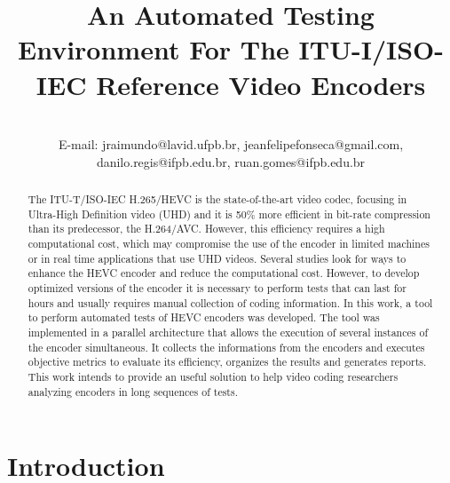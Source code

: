 \documentclass[journal]{IEEEtran}
\begin{document}
\title{An Automated Testing Environment For The ITU-I/ISO-IEC Reference Video Encoders}

\author{
							
\\E-mail:  jraimundo@lavid.ufpb.br, jeanfelipefonseca@gmail.com, danilo.regis@ifpb.edu.br, ruan.gomes@ifpb.edu.br
}


\maketitle
\begin{abstract}

The ITU-T/ISO-IEC H.265/HEVC is the state-of-the-art video codec, focusing in Ultra-High Definition video (UHD) and it is 50\% more efficient in bit-rate compression than its predecessor, the H.264/AVC. However, this efficiency requires a high computational cost, which may compromise the use of the encoder in limited machines or in real time applications that use UHD videos. Several studies look for ways to enhance the HEVC encoder and reduce the computational cost. However, to develop optimized versions of the encoder it is necessary to perform tests that can last for hours and usually requires manual collection of coding information.  In this work, a tool to perform automated tests of HEVC encoders  was developed. The tool was implemented in a parallel architecture that allows the execution of several instances of the encoder simultaneous. It collects the informations from the encoders and executes objective metrics to evaluate its efficiency, organizes the results and generates reports. This work intends to provide an useful solution to help video coding researchers analyzing encoders in long sequences of tests.

\end{abstract}


\section{Introduction}
\end{document}
